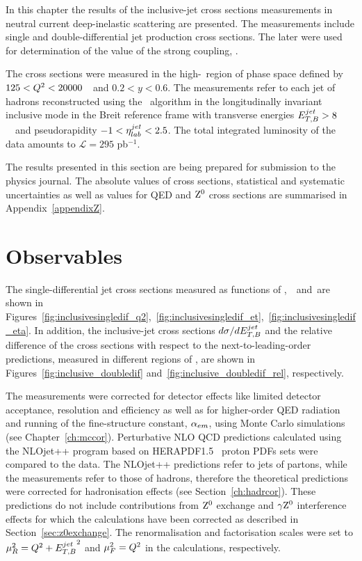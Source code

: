 In this chapter the results of the inclusive-jet cross sections measurements in neutral current deep-inelastic scattering are presented. The measurements include single and double-differential jet production cross sections. The later were used for determination of the value of the strong coupling, \asz. 

The cross sections were measured in the high-\qsq~region of phase space defined by $125 < \mbox{${Q^2}$} < 20000$~\GeV~and $0.2<y<0.6$. The measurements refer to each jet of hadrons reconstructed using the \kt\, algorithm in the longitudinally invariant inclusive mode in the Breit reference frame with transverse energies $\mbox{$E_{T,B}^{jet}$} > 8$~\GeV~and pseudorapidity $-1<\mbox{$\eta^{jet}_{lab}$}<2.5$. The total integrated luminosity of the data amounts to $\mathcal{L}=295$ pb$^{-1}$.

The results presented in this section are being prepared for submission to the physics journal. The absolute values of cross sections, statistical and systematic uncertainties as well as values for QED and $\mbox{$\rm{Z}^0$}$ cross sections are summarised in Appendix~\ref{appendixZ}.

\section{Observables}
The single-differential jet cross sections measured as functions of \qsq,~\etjetb~and~\etajetlab are shown in Figures~\ref{fig:inclusivesingledif_q2},~\ref{fig:inclusivesingledif_et},~\ref{fig:inclusivesingledif_eta}. In addition, the inclusive-jet cross sections $\mbox{$d\sigma/dE_{T,B}^{jet}$}$ and the relative difference of the cross sections with respect to the next-to-leading-order predictions, measured in different regions of \qsq, are shown in Figures~\ref{fig:inclusive_doubledif} and~\ref{fig:inclusive_doubledif_rel}, respectively.

The measurements were corrected for detector effects like limited detector acceptance, resolution and efficiency as well as for higher-order QED radiation and running of the fine-structure constant, $\mbox{$\alpha_{em}$}$, using Monte Carlo simulations (see Chapter~\ref{ch:mccor}). Perturbative NLO QCD predictions calculated using the NLOjet++ program based on HERAPDF1.5~\cite{herapdf} proton PDFs sets were compared to the data. The NLOjet++ predictions refer to jets of partons, while the measurements refer to those of hadrons, therefore the theoretical predictions were corrected for hadronisation effects (see Section~\ref{ch:hadrcor}). These predictions do not include contributions from $\mbox{$\rm{Z}^0$}$ exchange and $\gamma\mbox{$\rm{Z}^0$}$ interference effects for which the calculations have been corrected as described in Section~\ref{sec:z0exchange}. The renormalisation and factorisation scales were set to $\mu_R^2 = \mbox{${Q^2}$} + \mbox{$E_{T,B}^{jet}$}^2$ and $\mu_F^2 = \mbox{${Q^2}$}$ in the calculations, respectively.

